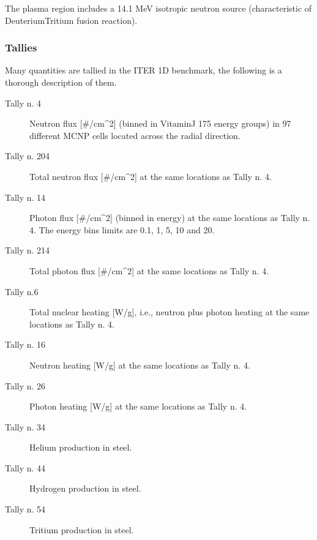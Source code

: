 \documentclass[letterpaper,10pt,english]{sphinxmanual}
\begin{document}
\sphinxAtStartPar
The plasma region includes a 14.1 MeV isotropic neutron source
(characteristic of Deuterium\sphinxhyphen{}Tritium fusion reaction).


\subsubsection{Tallies}
\label{\detokenize{usage/benchmarks:id2}}
\sphinxAtStartPar
Many quantities are tallied in the ITER 1D benchmark, the following is a thorough
description of them.
\begin{description}
\item[{Tally n. 4}] \leavevmode
\sphinxAtStartPar
Neutron flux {[}\#/cm\textasciicircum{}2{]} (binned in Vitamin\sphinxhyphen{}J 175 energy groups) in 97 different MCNP cells located across the radial direction.

\item[{Tally n. 204}] \leavevmode
\sphinxAtStartPar
Total neutron flux {[}\#/cm\textasciicircum{}2{]} at the same locations as Tally n. 4.

\item[{Tally n. 14}] \leavevmode
\sphinxAtStartPar
Photon flux {[}\#/cm\textasciicircum{}2{]} (binned in energy) at the same locations as Tally n. 4. The energy bins limits are 0.1, 1, 5, 10 and 20.

\item[{Tally n. 214}] \leavevmode
\sphinxAtStartPar
Total photon flux {[}\#/cm\textasciicircum{}2{]} at the same locations as Tally n. 4.

\item[{Tally n.6}] \leavevmode
\sphinxAtStartPar
Total nuclear heating {[}W/g{]}, i.e., neutron plus photon heating at the same locations as Tally n. 4.

\item[{Tally n. 16}] \leavevmode
\sphinxAtStartPar
Neutron heating {[}W/g{]} at the same locations as Tally n. 4.

\item[{Tally n. 26}] \leavevmode
\sphinxAtStartPar
Photon heating {[}W/g{]} at the same locations as Tally n. 4.

\item[{Tally n. 34}] \leavevmode
\sphinxAtStartPar
Helium production in steel.

\item[{Tally n. 44}] \leavevmode
\sphinxAtStartPar
Hydrogen production in steel.

\item[{Tally n. 54}] \leavevmode
\sphinxAtStartPar
Tritium production in steel.


\end{description}
\end{document}

